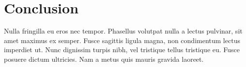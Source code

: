 \section{Conclusion}
Nulla fringilla eu eros nec tempor. Phasellus volutpat nulla a lectus pulvinar, sit amet maximus ex semper. Fusce sagittis ligula magna, non condimentum lectus imperdiet ut. Nunc dignissim turpis nibh, vel tristique tellus tristique eu. Fusce posuere dictum ultricies. Nam a metus quis mauris gravida laoreet. 